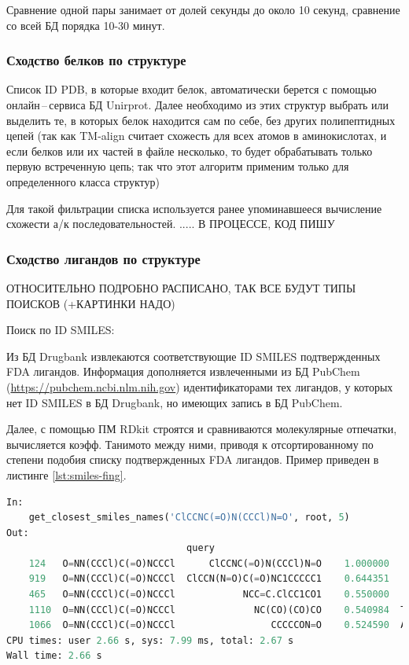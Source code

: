 \documentclass[a4paper,14pt]{article}         %
\begin{document}
Сравнение одной пары занимает от долей секунды до около 10 секунд, сравнение со всей БД порядка 10-30 минут.
\subsubsection{Сходство белков по структуре}
Список ID PDB, в которые входит белок, автоматически берется с помощью онлайн\,--\,сервиса БД Unirprot. Далее необходимо из этих структур выбрать или выделить те, в которых белок находится сам по себе, без других полипептидных цепей (так как TM-align считает схожесть для всех атомов в аминокислотах, и если белков или их частей в файле несколько, то будет обрабатывать только первую встреченную цепь; так что этот алгоритм применим только для определенного класса структур)

Для такой фильтрации списка используется ранее упоминавшееся вычисление схожести а/к последовательностей. .....
\color{orange} В ПРОЦЕССЕ, КОД ПИШУ
\color{black}
\subsubsection{Сходство лигандов по структуре}
\color{orange} ОТНОСИТЕЛЬНО ПОДРОБНО РАСПИСАНО, ТАК ВСЕ БУДУТ ТИПЫ ПОИСКОВ (+КАРТИНКИ НАДО)
\color{black}

Поиск по ID SMILES:

Из БД Drugbank извлекаются соответствующие ID SMILES подтвержденных FDA лигандов. Информация дополняется извлеченными из БД PubChem (\href{https://pubchem.ncbi.nlm.nih.gov}{https://pubchem.ncbi.nlm.nih.gov}) идентификаторами тех лигандов, у которых нет ID SMILES в БД Drugbank, но имеющих запись в БД PubChem.

Далее, с помощью ПМ RDkit строятся и сравниваются молекулярные отпечатки, вычисляется коэфф. Танимото между ними, приводя к отсортированному по степени подобия списку подтвержденных FDA лигандов. Пример приведен в листинге \ref{lst:smiles-fing}.

\begin{lstlisting}[language=Python, label={lst:smiles-fing}, caption={Сходство лигандов по текстовым молекулярным отпечаткам с помощью ПМ RDkit для входных данных~--- SMILES структуры молекулы.}]
In:
	get_closest_smiles_names('ClCCNC(=O)N(CCCl)N=O', root, 5)
Out:
								query       							smiles  			similarity     	 name
	124   O=NN(CCCl)C(=O)NCCCl      ClCCNC(=O)N(CCCl)N=O    1.000000    Carmustine
	919   O=NN(CCCl)C(=O)NCCCl  ClCCN(N=O)C(=O)NC1CCCCC1    0.644351     Lomustine
	465   O=NN(CCCl)C(=O)NCCCl            NCC=C.ClCC1CO1    0.550000     Sevelamer
	1110  O=NN(CCCl)C(=O)NCCCl              NC(CO)(CO)CO    0.540984  Tromethamine
	1066  O=NN(CCCl)C(=O)NCCCl                 CCCCCON=O    0.524590  Amyl Nitrite
CPU times: user 2.66 s, sys: 7.99 ms, total: 2.67 s
Wall time: 2.66 s
\end{lstlisting}
\end{document}

